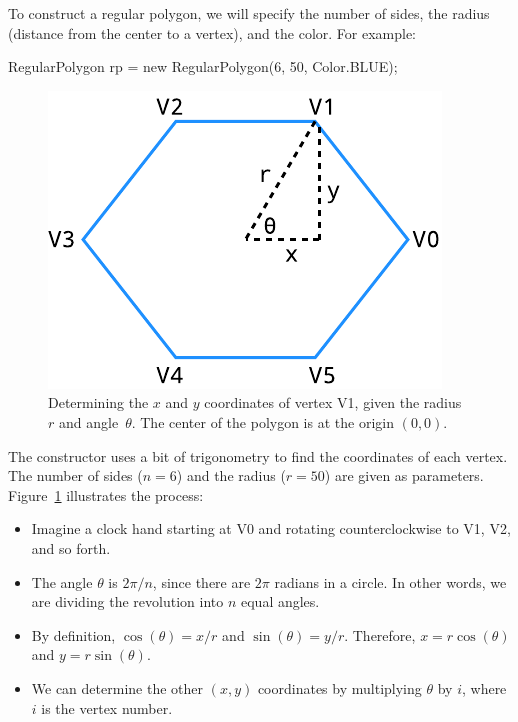 To construct a regular polygon, we will specify the number of sides, the radius (distance from the center to a vertex), and the color.
For example:

\begin{code}
RegularPolygon rp = new RegularPolygon(6, 50, Color.BLUE);
\end{code}

\begin{figure}[!ht]
\begin{center}
\includegraphics{figs/hexagon.pdf}
\caption{Determining the $x$ and $y$ coordinates of vertex V1, given the radius~$r$ and angle~$\theta$. The center of the polygon is at the origin $(0, 0)$.}
\label{fig:hexagon}
\end{center}
\end{figure}

The constructor uses a bit of trigonometry to find the coordinates of each vertex.
The number of sides ($n=6$) and the radius ($r=50$) are given as parameters.
Figure~\ref{fig:hexagon} illustrates the process:

\begin{itemize}
\item Imagine a clock hand starting at V0 and rotating counterclockwise to V1, V2, and so forth.
\item The angle $\theta$ is $2 \pi / n$, since there are $2\pi$ radians in a circle.
In other words, we are dividing the revolution into $n$ equal angles.
\item By definition, $\cos(\theta) = x/r$ and $\sin(\theta) = y/r$. Therefore, $x = r \cos(\theta)$ and $y = r \sin(\theta)$.
\item We can determine the other $(x, y)$ coordinates by multiplying $\theta$ by $i$, where $i$ is the vertex number.
\end{itemize}

